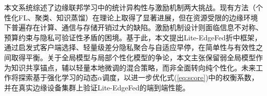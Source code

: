 \documentclass[a4paper,12pt]{article}
\begin{document}
本文系统综述了边缘联邦学习中的统计异构性与激励机制两大挑战。现有方法（个性化FL、聚类、知识蒸馏）在理论上取得了显著进展，但在资源受限的边缘环境下普遍存在计算、通信与存储开销过大的缺陷。激励机制设计则面临信息不对称、预算约束与隐私可验证性矛盾的困境。基于此，本文提出Lite-EdgeFed折中框架，通过启发式客户端选择、轻量级差分隐私聚合与自适应早停，在简单性与有效性之间取得平衡。关于全局模型与局部个性化模型的争论，本文主张保留弱全局模型作为知识共享锚点，辅以轻量本地微调的混合策略，而非全面转向纯个性化。未来工作将探索基于强化学习的动态$\alpha$调度，以进一步优化式(\ref{eq:score})中的权衡系数，并在真实边缘设备集群上验证Lite-EdgeFed的端到端性能。



\end{document}
